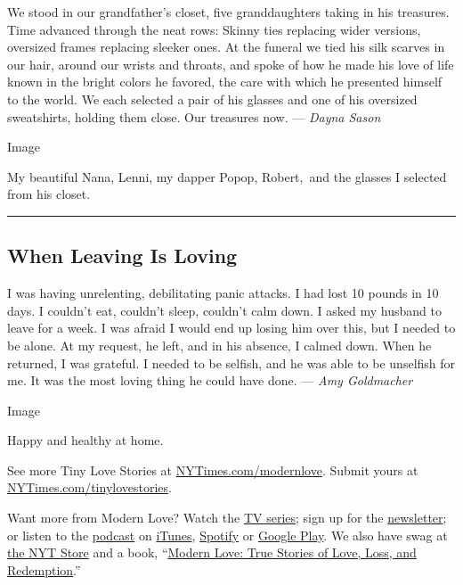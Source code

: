 We stood in our grandfather's closet, five granddaughters taking in his
treasures. Time advanced through the neat rows: Skinny ties replacing
wider versions, oversized frames replacing sleeker ones. At the funeral
we tied his silk scarves in our hair, around our wrists and throats, and
spoke of how he made his love of life known in the bright colors he
favored, the care with which he presented himself to the world. We each
selected a pair of his glasses and one of his oversized sweatshirts,
holding them close. Our treasures now. --- \emph{Dayna Sason}

Image

My beautiful Nana, Lenni, my dapper Popop, Robert,~and the glasses I
selected from his closet.

\begin{center}\rule{0.5\linewidth}{\linethickness}\end{center}

\hypertarget{when-leaving-is-loving}{%
\subsection{When Leaving Is Loving}\label{when-leaving-is-loving}}

I was having unrelenting, debilitating panic attacks. I had lost 10
pounds in 10 days. I couldn't eat, couldn't sleep, couldn't calm down. I
asked my husband to leave for a week. I was afraid I would end up losing
him over this, but I needed to be alone. At my request, he left, and in
his absence, I calmed down. When he returned, I was grateful. I needed
to be selfish, and he was able to be unselfish for me. It was the most
loving thing he could have done. --- \emph{Amy Goldmacher}

Image

Happy and healthy at home.

See more Tiny Love Stories at
\href{https://www.nytimes3xbfgragh.onion/column/modern-love}{NYTimes.com/modernlove}.
Submit yours at
\href{http://nytimes3xbfgragh.onion/tinylovestories}{NYTimes.com/tinylovestories}.

Want more from Modern Love? Watch the
\href{https://www.nytimes3xbfgragh.onion/2019/09/12/style/modern-love-tv-show-trailer.html}{TV
series}; sign up for the
\href{https://www.nytimes3xbfgragh.onion/newsletters/love-letter}{newsletter};
or listen to the
\href{https://www.nytimes3xbfgragh.onion/column/modern-love-podcast}{podcast}
on
\href{https://itunes.apple.com/us/podcast/modern-love/id1065559535?mt=2\&version=meter+at+0\&module=meter-Links\&pgtype=article\&contentId=\&mediaId=\&referrer=\&priority=true\&action=click\&contentCollection=meter-links-click}{iTunes},
\href{https://open.spotify.com/show/03Er7mSPq9IEewOgbPD3vO}{Spotify} or
\href{https://play.google.com/music/listen?u=0\#/ps/Iktqjbkz7bychbnofblw32dik64}{Google
Play}. We also have swag at
\href{https://store.nytimes3xbfgragh.onion/collections/modern-love}{the
NYT Store} and a book,
``\href{https://www.penguinrandomhouse.com/books/623036/modern-love-revised-and-updated-by-edited-by-daniel-jones-with-contributions-by-andrew-rannells-ayelet-waldman-amy-krouse-rosenthal-veronica-chambers-and-more/}{Modern
Love: True Stories of Love, Loss, and Redemption}.''

